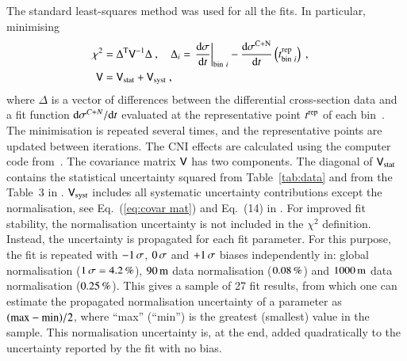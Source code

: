 The standard least-squares method was used for all the fits. In particular, minimising
\begin{equation}
\label{eq:chi sq A}
	\begin{aligned}
		\chi^2 &= \Delta^{\rm T} \mathsf{V}^{-1} \Delta\ ,\quad
			\Delta_i = \left.{{\rm d}\sigma\over {\rm d} t}\right|_{{\rm bin}\ i} - {{\rm d}\sigma^{\rm C+N}\over{\rm d} t}\left(t^{\rm rep}_{{\rm bin}\ i}\right)\ ,\cr
		\mathsf{V} &= \mathsf{V}_{\rm stat} + \mathsf{V}_{\rm syst}\ ,\cr
	\end{aligned}
\end{equation}
where $\Delta$ is a vector of differences between the differential cross-section data and a fit function ${\rm d}\sigma^{C+N}/{\rm d} t$ evaluated at the representative point $t^{\rm rep}$ of each bin~\cite{lafferty94}. The minimisation is repeated several times, and the representative points are updated between iterations. The CNI effects are calculated using the computer code from~\cite{elegent}. The covariance matrix $\mathsf{V}$ has two components. The diagonal of $\mathsf{V}_{\rm stat}$ contains the statistical uncertainty squared from Table~\ref{tab:data} and from the Table~3 in \cite{8tev-90m}. $\mathsf{V}_{\rm syst}$ includes all systematic uncertainty contributions except the normalisation, see Eq.~(\ref{eq:covar mat}) and Eq.~(14) in \cite{8tev-90m}. For improved fit stability, the normalisation uncertainty is not included in the $\chi^2$ definition. Instead, the uncertainty is propagated for each fit parameter. For this purpose, the fit is repeated with $-1\,{\rm \sigma}$, $0\,{\rm \sigma}$ and $+1\,{\rm \sigma}$ biases independently in: global normalisation ($1\,{\rm \sigma} = 4.2\,{\rm \%}$), $90\,{\rm m}$ data normalisation ($0.08\,{\rm \%}$) and $1000\,{\rm m}$ data normalisation ($0.25\,{\rm \%}$). This gives a sample of 27 fit results, from which one can estimate the propagated normalisation uncertainty of a parameter as $(\hbox{max} - \hbox{min})/2$, where ``max'' (``min'') is the greatest (smallest) value in the sample. This normalisation uncertainty is, at the end, added quadratically to the uncertainty reported by the fit with no bias.


